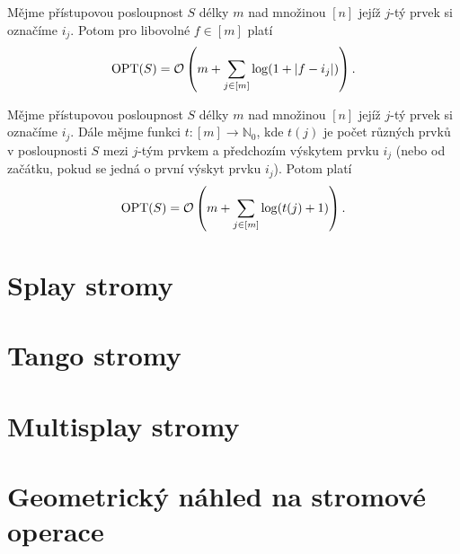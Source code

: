 \begin{veta}
Mějme přístupovou posloupnost $S$ délky $m$ nad množinou $[n]$ jejíž $j$-tý prvek si označíme $i_j$. Potom pro libovolné $f\in [m]$ platí $$\operatorname{OPT}(S) = \mathcal O\left(m + \sum_{j\in [m]} \log(1 + |f-i_j|) \right).$$
\end{veta}

\begin{veta}

Mějme přístupovou posloupnost $S$ délky $m$ nad množinou $[n]$ jejíž $j$-tý prvek si označíme $i_j$. Dále mějme funkci $t: [m]\rightarrow \mathbb N_0$, kde $t(j)$ je počet různých prvků v posloupnosti $S$ mezi $j$-tým prvkem a předchozím výskytem prvku $i_j$ (nebo od začátku, pokud se jedná o první výskyt prvku $i_j$). Potom platí $$\operatorname{OPT}(S) = \mathcal O\left(m + \sum_{j\in [m]}\log (t(j)+1) \right).$$
\end{veta}




\section{Splay stromy}

\section{Tango stromy}

\section{Multisplay stromy}

\section{Geometrický náhled na stromové operace}
